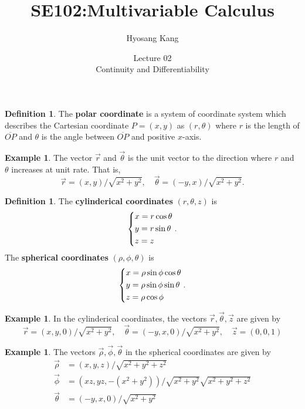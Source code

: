 \documentclass[t]{beamer}
\title[]{SE102:Multivariable Calculus}
\author[]{Hyosang Kang\inst{1}}
\institute[]{\inst{1}Division of Mathematics\\ School of Interdisciplinary Studies\\ DGIST}
\date[]{Lecture 02\\
Continuity and Differentiability}
\theoremstyle{plain}
\theoremstyle{definition}
\newtheorem{defn}[thm]{Definition}
\newtheorem{exmp}[thm]{Example}
\begin{document}
\begin{frame}
\titlepage
\end{frame}

\begin{frame}
\begin{defn}
	The \textbf{polar coordinate} is a system of coordinate system
	which describes the Cartesian coordinate $P=(x,y)$
	as $(r,\theta)$ where $r$ is the length of
	$\overline{OP}$ and $\theta$ is the angle between 
	$\overline{OP}$ and positive $x$-axis.
\end{defn}
\begin{exmp}
	The vector $\vec r$ and $\vec\theta$ is the
	unit vector to the direction where $r$ and 
	$\theta$ increases at unit rate. That is,
	$$\vec r = (x,y)/\sqrt{x^2+y^2},\quad
	\vec \theta = (-y, x)/\sqrt{x^2+y^2}.$$
\end{exmp}
\end{frame}

\begin{frame}
\begin{defn}
	The \textbf{cylinderical
	coordinates} $(r,\theta,z)$ is 
	$$\begin{dcases}
		x = r\cos\theta \\
		y = r\sin\theta \\
		z = z \end{dcases}.$$
	The \textbf{spherical
	coordinates} $(\rho,\phi,\theta)$ is
	$$\begin{dcases}
		x = \rho\sin\phi\cos\theta \\
		y = \rho\sin\phi\sin\theta \\
		z = \rho\cos\phi \end{dcases}.$$
\end{defn}
\end{frame}

\begin{frame}
\begin{exmp}
	In the cylinderical coordinates, the vectors
	$\vec r, \vec \theta, \vec z$ are given by
	$$\vec r = (x,y,0)/\sqrt{x^2+y^2},\quad
	\vec \theta = (-y,x,0)/\sqrt{x^2+y^2},\quad
	\vec z = (0,0,1)$$
\end{exmp}
\begin{exmp}
	The vectors $\vec\rho, \vec\phi, 
	\vec\theta$ in the spherical coordinates are 
	given by
	\begin{align*}
	\vec\rho &= (x,y,z)/\sqrt{x^2+y^2+z^2}\\
	\vec\phi &= (xz,yz,-(x^2+y^2))/\sqrt{x^2+y^2}
	\sqrt{x^2+y^2+z^2}\\
	\vec\theta &= (-y,x,0)/\sqrt{x^2+y^2}
	\end{align*} 
\end{exmp}
\end{frame}
\end{document}
